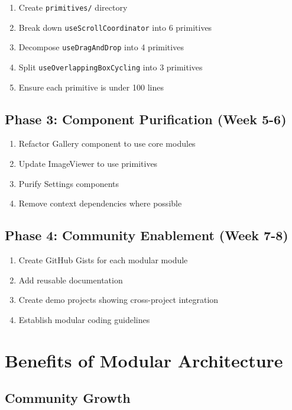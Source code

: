 \documentclass[11pt]{article}
\begin{document}
\begin{enumerate}
\item Create \texttt{primitives/} directory
\item Break down \texttt{useScrollCoordinator} into 6 primitives
\item Decompose \texttt{useDragAndDrop} into 4 primitives
\item Split \texttt{useOverlappingBoxCycling} into 3 primitives
\item Ensure each primitive is under 100 lines
\end{enumerate}

\subsection{Phase 3: Component Purification (Week 5-6)}

\begin{enumerate}
\item Refactor Gallery component to use core modules
\item Update ImageViewer to use primitives
\item Purify Settings components
\item Remove context dependencies where possible
\end{enumerate}

\subsection{Phase 4: Community Enablement (Week 7-8)}

\begin{enumerate}
\item Create GitHub Gists for each modular module
\item Add reusable documentation
\item Create demo projects showing cross-project integration
\item Establish modular coding guidelines
\end{enumerate}

\section{Benefits of Modular Architecture}

\subsection{Community Growth}
\end{document}
